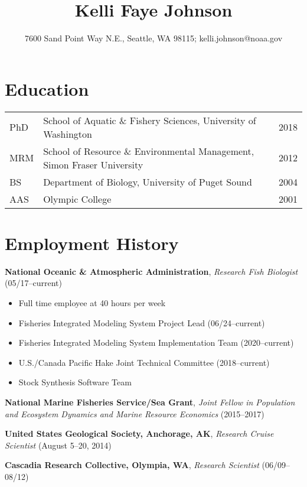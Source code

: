 \documentclass[10pt]{article}
\title{\bfseries\Large Kelli Faye Johnson}
\author{7600 Sand Point Way N.E., Seattle, WA 98115; kelli.johnson@noaa.gov}
\date{}
\begin{document}

\maketitle
\vspace{-15mm}
\noindent\makebox[\linewidth]{\rule{\paperwidth}{0.4pt}}

\section*{Education}
\begin{tabular}{lll}
PhD & School of Aquatic \& Fishery Sciences, University of Washington & 2018 \\
MRM & School of Resource \& Environmental Management, Simon Fraser University & 2012 \\
BS & Department of Biology, University of Puget Sound & 2004 \\
AAS & Olympic College & 2001 \\
\end{tabular}

\section*{Employment History}

\textbf{National Oceanic \& Atmospheric Administration}, \textit{Research Fish Biologist} (05/17--current)
\begin{itemize}
\vspace{-2.5mm}
  \item Full time employee at 40 hours per week
  \item Fisheries Integrated Modeling System Project Lead (06/24--current)
  \item Fisheries Integrated Modeling System Implementation Team (2020--current)
  \item U.S./Canada Pacific Hake Joint Technical Committee (2018--current)
  \item Stock Synthesis Software Team
\end{itemize}

\noindent \textbf{National Marine Fisheries Service/Sea Grant}, \textit{Joint Fellow in Population and Ecosystem Dynamics and Marine Resource Economics} (2015--2017)

\noindent \textbf{United States Geological Society, Anchorage, AK}, \textit{Research Cruise Scientist} (August 5--20, 2014)

\noindent \textbf{Cascadia Research Collective, Olympia, WA}, \textit{Research Scientist} (06/09--08/12)
\end{document}
